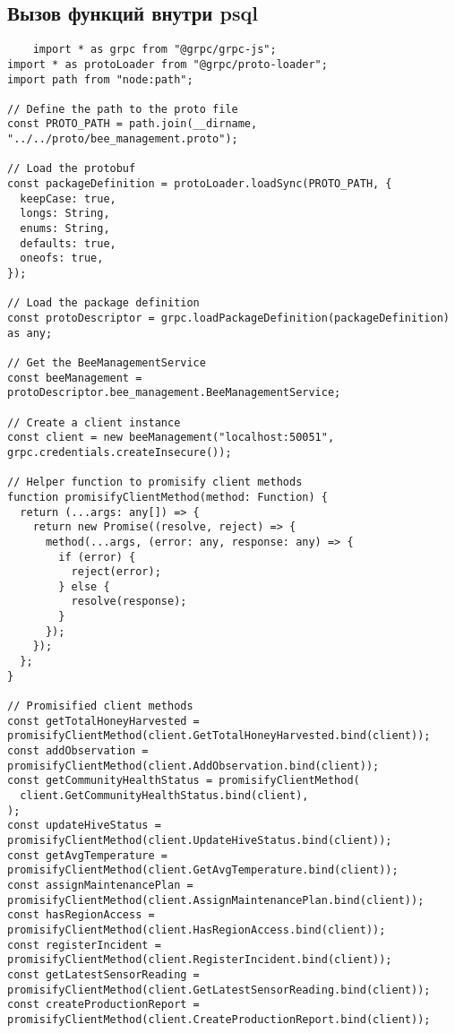 \documentclass{article}
\begin{document}
\subsection{Вызов функций внутри psql}
\begin{lstlisting}
    import * as grpc from "@grpc/grpc-js";
import * as protoLoader from "@grpc/proto-loader";
import path from "node:path";

// Define the path to the proto file
const PROTO_PATH = path.join(__dirname, "../../proto/bee_management.proto");

// Load the protobuf
const packageDefinition = protoLoader.loadSync(PROTO_PATH, {
  keepCase: true,
  longs: String,
  enums: String,
  defaults: true,
  oneofs: true,
});

// Load the package definition
const protoDescriptor = grpc.loadPackageDefinition(packageDefinition) as any;

// Get the BeeManagementService
const beeManagement = protoDescriptor.bee_management.BeeManagementService;

// Create a client instance
const client = new beeManagement("localhost:50051", grpc.credentials.createInsecure());

// Helper function to promisify client methods
function promisifyClientMethod(method: Function) {
  return (...args: any[]) => {
    return new Promise((resolve, reject) => {
      method(...args, (error: any, response: any) => {
        if (error) {
          reject(error);
        } else {
          resolve(response);
        }
      });
    });
  };
}

// Promisified client methods
const getTotalHoneyHarvested = promisifyClientMethod(client.GetTotalHoneyHarvested.bind(client));
const addObservation = promisifyClientMethod(client.AddObservation.bind(client));
const getCommunityHealthStatus = promisifyClientMethod(
  client.GetCommunityHealthStatus.bind(client),
);
const updateHiveStatus = promisifyClientMethod(client.UpdateHiveStatus.bind(client));
const getAvgTemperature = promisifyClientMethod(client.GetAvgTemperature.bind(client));
const assignMaintenancePlan = promisifyClientMethod(client.AssignMaintenancePlan.bind(client));
const hasRegionAccess = promisifyClientMethod(client.HasRegionAccess.bind(client));
const registerIncident = promisifyClientMethod(client.RegisterIncident.bind(client));
const getLatestSensorReading = promisifyClientMethod(client.GetLatestSensorReading.bind(client));
const createProductionReport = promisifyClientMethod(client.CreateProductionReport.bind(client));


\end{lstlisting}
\end{document}
